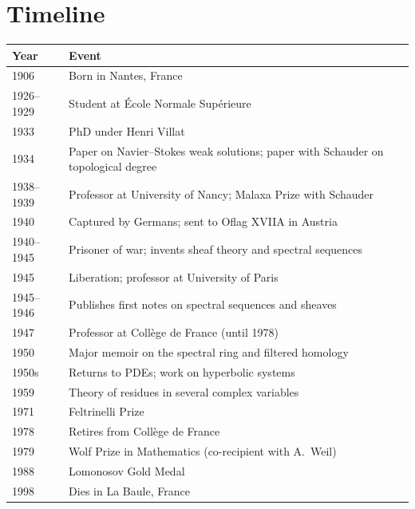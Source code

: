 \section*{Timeline}

\begin{tabularx}{\linewidth}{|p{1.5cm}|>{\raggedright\arraybackslash}X|}
\hline
\textbf{Year} & \textbf{Event} \\ \hline
1906 & Born in Nantes, France \\ \hline
1926--1929 & Student at {\'E}cole Normale Sup{\'e}rieure \\ \hline
1933 & PhD under Henri Villat \\ \hline
1934 & Paper on Navier--Stokes weak solutions; paper with Schauder on topological degree \\ \hline
1938--1939 & Professor at University of Nancy; Malaxa Prize with Schauder \\ \hline
1940 & Captured by Germans; sent to Oflag XVIIA in Austria \\ \hline
1940--1945 & Prisoner of war; invents sheaf theory and spectral sequences \\ \hline
1945 & Liberation; professor at University of Paris \\ \hline
1945--1946 & Publishes first notes on spectral sequences and sheaves \\ \hline
1947 & Professor at Coll{\`e}ge de France (until 1978) \\ \hline
1950 & Major memoir on the spectral ring and filtered homology \\ \hline
1950s & Returns to PDEs; work on hyperbolic systems \\ \hline
1959 & Theory of residues in several complex variables \\ \hline
1971 & Feltrinelli Prize \\ \hline
1978 & Retires from Coll{\`e}ge de France \\ \hline
1979 & Wolf Prize in Mathematics (co-recipient with A.\ Weil) \\ \hline
1988 & Lomonosov Gold Medal \\ \hline
1998 & Dies in La Baule, France \\ \hline
\end{tabularx}
